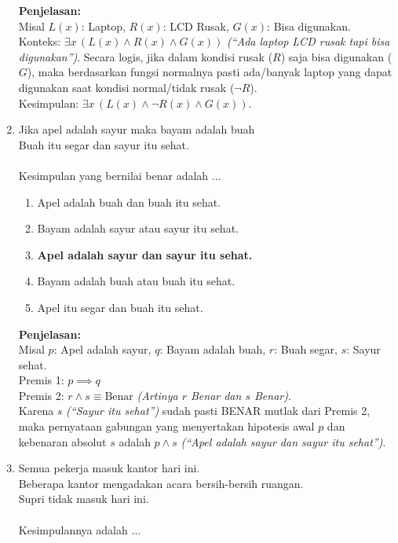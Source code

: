 \begin{multicols}{2}
\begin{enumerate}
\begin{enumerate}
    \end{enumerate}
    \textbf{Penjelasan: } \\
    Misal $L(x)$: Laptop, $R(x)$: LCD Rusak, $G(x)$: Bisa digunakan. \\
    Konteks: $\exists x \, (L(x) \land R(x) \land G(x))$ \textit{(``Ada laptop LCD rusak tapi bisa digunakan'')}.
    Secara logis, jika dalam kondisi rusak ($R$) saja bisa digunakan ($G$), maka berdasarkan fungsi normalnya pasti ada/banyak laptop yang dapat digunakan saat kondisi normal/tidak rusak ($\neg R$). \\
    Kesimpulan: $\exists x \, (L(x) \land \neg R(x) \land G(x))$.
  \item Jika apel adalah sayur maka bayam adalah buah \\
    Buah itu segar dan sayur itu sehat. \\ \\
    Kesimpulan yang bernilai benar adalah $\dots$
    \begin{enumerate}
    \item Apel adalah buah dan buah itu sehat.
    \item Bayam adalah sayur atau sayur itu sehat.
    \item \textbf{Apel adalah sayur dan sayur itu sehat.}
    \item Bayam adalah buah atau buah itu sehat.
    \item Apel itu segar dan buah itu sehat.
    \end{enumerate}
    \textbf{Penjelasan: } \\
    Misal $p$: Apel adalah sayur, $q$: Bayam adalah buah, $r$: Buah segar, $s$: Sayur sehat. \\
    Premis 1: $p \implies q$ \\
    Premis 2: $r \land s \equiv \text{Benar}$ \textit{(Artinya $r$ Benar dan $s$ Benar)}. \\
    Karena $s$ \textit{(``Sayur itu sehat'')} sudah pasti BENAR mutlak dari Premis 2, maka pernyataan gabungan yang menyertakan hipotesis awal $p$ dan kebenaran absolut $s$ adalah $p \land s$ \textit{(``Apel adalah sayur dan sayur itu sehat'')}.
  \item Semua pekerja masuk kantor hari ini. \\
    Beberapa kantor mengadakan acara bersih-bersih ruangan. \\
    Supri tidak masuk hari ini. \\ \\
    Kesimpulannya adalah $\dots$ 
    \begin{enumerate}

\end{enumerate}
\end{enumerate}
\end{multicols}
